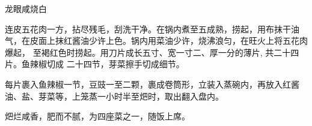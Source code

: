 \begin{recipe}{龙眼咸烧白}

\ingredients


\preparation

\step 连皮五花肉一方，拈尽残毛，刮洗干净。在锅内煮至五成熟，捞起，用布抹干油
气，在皮面上抹红酱油少许上色。锅内用菜油少许，烧沸浪匀，在旺火上将五花肉爆起，
至褐红色时捞起。用刀片成长五寸、宽一寸二、厚一分的薄片, 共二十四片。鱼辣椒切成
二十四节，芽菜擦手切成细节。

\step 每片裹入鱼辣椒一节，豆豉一至二颗，裹成卷筒形，立装入蒸碗内，再放入红酱
油、盐、芽菜等，上笼蒸一小时半至𤆵时，取出翻入盘内。

\features

𤆵烂咸香，肥而不腻，为四座菜之一，随饭上席。

\end{recipe}

